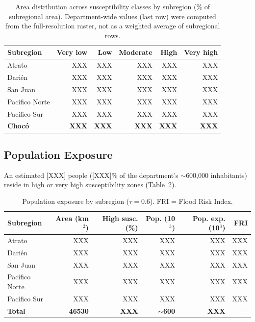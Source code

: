 \documentclass{article}
\begin{document}
\begin{table}[htbp]
\caption{Area distribution across susceptibility classes by subregion (\% of subregional area). Department-wide values (last row) were computed from the full-resolution raster, not as a weighted average of subregional rows.}
\label{tab:suscept_area}
\centering
\footnotesize
\begin{tabular}{lrrrrr}
\toprule
\textbf{Subregion} & \textbf{Very low} & \textbf{Low} & \textbf{Moderate} & \textbf{High} & \textbf{Very high} \\
\midrule
Atrato               & XXX & XXX & XXX & XXX & XXX \\
Dari\'en             & XXX & XXX & XXX & XXX & XXX \\
San Juan             & XXX & XXX & XXX & XXX & XXX \\
Pac\'ifico Norte     & XXX & XXX & XXX & XXX & XXX \\
Pac\'ifico Sur       & XXX & XXX & XXX & XXX & XXX \\
\midrule
\textbf{Choc\'o}     & \textbf{XXX} & \textbf{XXX} & \textbf{XXX} & \textbf{XXX} & \textbf{XXX} \\
\bottomrule
\end{tabular}
\end{table}

\subsection{Population Exposure}

An estimated [XXX] people ([XXX]\% of the department's $\sim$600,000 inhabitants) reside in high or very high susceptibility zones (Table~\ref{tab:exposure}).

\begin{table}[htbp]
\caption{Population exposure by subregion ($\tau = 0.6$). FRI = Flood Risk Index.}
\label{tab:exposure}
\centering
\footnotesize
\begin{tabular}{lrrrrr}
\toprule
\textbf{Subregion} & \textbf{Area (km$^2$)} & \textbf{High susc. (\%)} & \textbf{Pop. (10$^3$)} & \textbf{Pop. exp. (10$^3$)} & \textbf{FRI} \\
\midrule
Atrato               & XXX & XXX & XXX & XXX & XXX \\
Dari\'en             & XXX & XXX & XXX & XXX & XXX \\
San Juan             & XXX & XXX & XXX & XXX & XXX \\
Pac\'ifico Norte     & XXX & XXX & XXX & XXX & XXX \\
Pac\'ifico Sur       & XXX & XXX & XXX & XXX & XXX \\
\midrule
\textbf{Total}       & \textbf{\num{46530}} & \textbf{XXX} & \textbf{$\sim$600} & \textbf{XXX} & -- \\
\bottomrule
\end{tabular}
\end{table}
\end{document}
